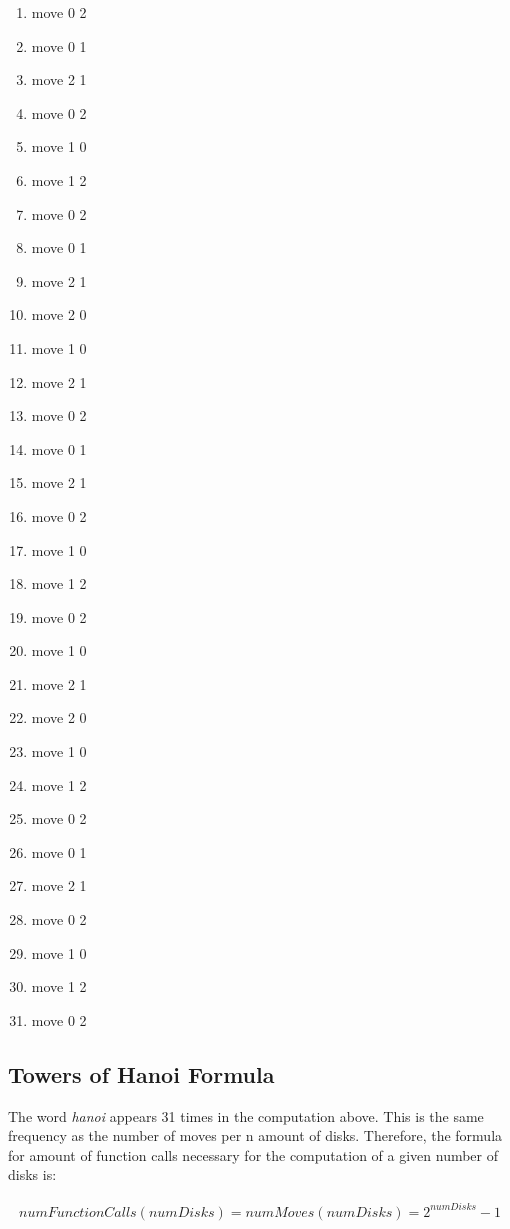 \documentclass{article}
\theoremstyle{theorem}
\theoremstyle{definition}
\theoremstyle{remark}
\begin{document}
\begin{enumerate}
  \centering
  \item move 0 2
  \item move 0 1
  \item move 2 1
  \item move 0 2
  \item move 1 0
  \item move 1 2
  \item move 0 2
  \item move 0 1
  \item move 2 1
  \item move 2 0
  \item move 1 0
  \item move 2 1
  \item move 0 2
  \item move 0 1
  \item move 2 1
  \item move 0 2
  \item move 1 0
  \item move 1 2
  \item move 0 2
  \item move 1 0
  \item move 2 1
  \item move 2 0
  \item move 1 0
  \item move 1 2
  \item move 0 2
  \item move 0 1
  \item move 2 1
  \item move 0 2
  \item move 1 0
  \item move 1 2
  \item move 0 2
\end{enumerate}

\subsection{Towers of Hanoi Formula}

The word \textit{hanoi} appears 31 times in the computation above. This is the same frequency as the number of moves per n amount of disks. Therefore, the formula for amount of function calls necessary for the computation of a given number of disks is: 


\begin{align}
numFunctionCalls(numDisks) = numMoves(numDisks) = 2^{numDisks} - 1
\end{align}
\end{document}
